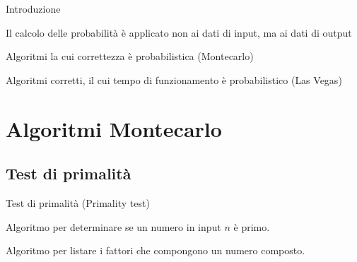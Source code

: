 \begin{frame}{Introduzione}

\vspace{-9pt}
\begin{myboxtitle}
Il calcolo delle probabilità è applicato non ai dati di input, ma ai dati di output
\BIL
\item Algoritmi la cui correttezza è probabilistica (\alert{Montecarlo})
\item  Algoritmi corretti, il cui tempo di funzionamento è probabilistico (\alert{Las Vegas})
\EIL
\end{myboxtitle}

\end{frame}

\section{Algoritmi Montecarlo}

\subsection{Test di primalità}


\begin{frame}{Test di primalità (Primality test)}
    
\vspace{-9pt}
\begin{myboxtitle}
Algoritmo per determinare se un numero in input $n$ è primo.
\end{myboxtitle}

\begin{myboxtitle}[Fattorizzazione]
Algoritmo per listare i fattori che compongono un numero composto.
\end{myboxtitle}

\vspace{-6pt}
\end{frame}


